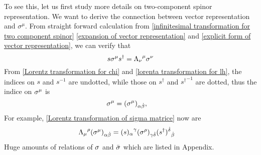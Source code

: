 To see this, let us first study more details on two-component spinor representation. We want to derive the connection between vector representation and $\sigma^{\mu}$. From straight forward calculation from \eqref{infinitesimal transformation for two component spinor} \eqref{expansion of vector representation} and 
\eqref{explicit form of vector representation}, we can verify that
\begin{equation}\label{Lorentz transformation of sigma matrice}
s\sigma^{\mu}s^{\dagger} = {\Lambda_\nu}^\mu \sigma^\nu
\end{equation}
From \eqref{Lorentz transformation for chi} and \eqref{lorenta transformation for lh}, the indices on $s$ and $s^{-1}$ are undotted, while those on $s^{\dagger}$ and ${s^{\dagger}}^{-1}$ are dotted, thus the indice on $\sigma^{\mu}$ is
\begin{equation}
  \sigma^{\mu} = (\sigma^{\mu})_{\alpha\dot{\beta}},\quad
\end{equation}
For example, \eqref{Lorentz transformation of sigma matrice} now are
\begin{align}
{\Lambda_{\mu}}^{\rho} (\sigma^{\mu})_{\alpha\dot{\beta}} &=
({s)_{\alpha}}^{\gamma}
(\sigma^{\rho})_{\gamma\dot{\delta}}
{({s}^{\dagger})^{\dot{\delta}}}_{\dot{\beta}}
\end{align}
Huge amounts of relations of $\sigma$ and $\bar{\sigma}$ which are listed in Appendix.

